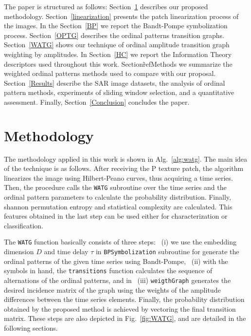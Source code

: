\documentclass[journal]{IEEEtran}
\begin{document}
	The paper is structured as follows:
	Section~\ref{methodology} describes our proposed methodology.
	Section~\ref{linearization} presents the patch linearization process of the images.
	In the Section~\ref{BP} we report the Bandt-Pompe symbolization process.
	Section~\ref{OPTG} describes the ordinal patterns transition graphs.
	Section~\ref{WATG} shows our technique of ordinal amplitude transition graph weighting by amplitudes.
	In Section~\ref{HC} we report the Information Theory descriptors used throughout this work.
	Section\~ref{Methods} we summarize the weighted ordinal patterns methods used to compare with our proposal.
	Section~\ref{Results} describe the SAR image datasets, 
	the analysis of ordinal pattern methods, 
	experiments of sliding window selection, 
	and a quantitative assessment.
	Finally, Section~\ref{Conclusion} concludes the paper.
	
	\section{Methodology}\label{methodology}
	
	The methodology applied in this work is shown in Alg.~\ref{alg:watg}.
	The main idea of the technique is as follows.
	After receiving the P texture patch, the algorithm linearizes the image using Hilbert-Peano curves, thus acquiring a time series.
	Then, the procedure calls the \texttt{WATG} subroutine over the time series and the ordinal pattern parameters to calculate the probability distribution.
	Finally, shannon permutation entropy and statistical complexity are calculated.
	This features obtained in the last step can be used either for characterization or classification.
	
	The \texttt{WATG} function basically consists of three steps: ~(i) we use the embedding dimension $D$ and time delay $\tau$ in \texttt{BPSymbolization} subroutine for generate the ordinal patterns of the given time series using Bandt-Pompe, ~(ii) with the symbols in hand, the \texttt{transitions} function calculates the sequence of alternations of the ordinal patterns, and in ~(iii) \texttt{weigthGraph} generates the desired incidence matrix of the graph using the weights of the amplitude differences between the time series elements.
	Finally, the probability distribution obtained by the proposed method is achieved by vectoring the final transition matrix.
	These steps are also depicted in Fig.~\ref{fig:WATG}, and are detailed in the following sections.
	
\end{document}
